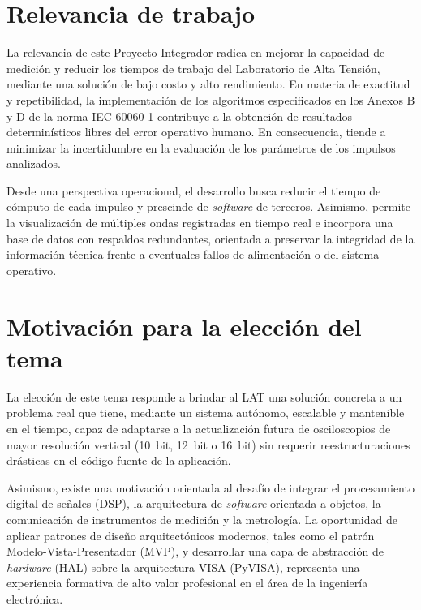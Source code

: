 \section{Relevancia de trabajo}
\label{sec:relevancia}
\vspace{3\baselineskip}

La relevancia de este Proyecto Integrador radica en mejorar la capacidad de medición y reducir los tiempos de trabajo del Laboratorio de Alta Tensión, mediante una solución de bajo costo y alto rendimiento. En materia de exactitud y repetibilidad, la implementación de los algoritmos especificados en los Anexos B y D de la norma IEC 60060-1 \cite{iec60060_1} contribuye a la obtención de resultados determinísticos libres del error operativo humano. En consecuencia, tiende a minimizar la incertidumbre en la evaluación de los parámetros de los impulsos analizados.


Desde una perspectiva operacional, el desarrollo busca reducir el tiempo de cómputo de cada impulso y prescinde de \emph{software} de terceros. Asimismo, permite la visualización de múltiples ondas registradas en tiempo real e incorpora una base de datos con respaldos redundantes, orientada a preservar la integridad de la información técnica frente a eventuales fallos de alimentación o del sistema operativo.

\section{Motivación para la elección del tema}
\label{sec:motivacion}
\vspace{3\baselineskip}

La elección de este tema responde a brindar al LAT una solución concreta a un problema real que tiene, mediante un sistema autónomo, escalable y mantenible en el tiempo, capaz de adaptarse a la actualización futura de osciloscopios de mayor resolución vertical (\qty{10}{bit}, \qty{12}{bit} o \qty{16}{bit}) sin requerir reestructuraciones drásticas en el código fuente de la aplicación.

Asimismo, existe una motivación orientada al desafío de integrar el procesamiento digital de señales (DSP), la arquitectura de \emph{software} orientada a objetos, la comunicación de instrumentos de medición y la metrología. La oportunidad de aplicar patrones de diseño arquitectónicos modernos, tales como el patrón Modelo-Vista-Presentador (MVP), y desarrollar una capa de abstracción de \emph{hardware} (HAL) sobre la arquitectura VISA \cite{rohde_schwarz_visa} (PyVISA), representa una experiencia formativa de alto valor profesional en el área de la ingeniería electrónica.

